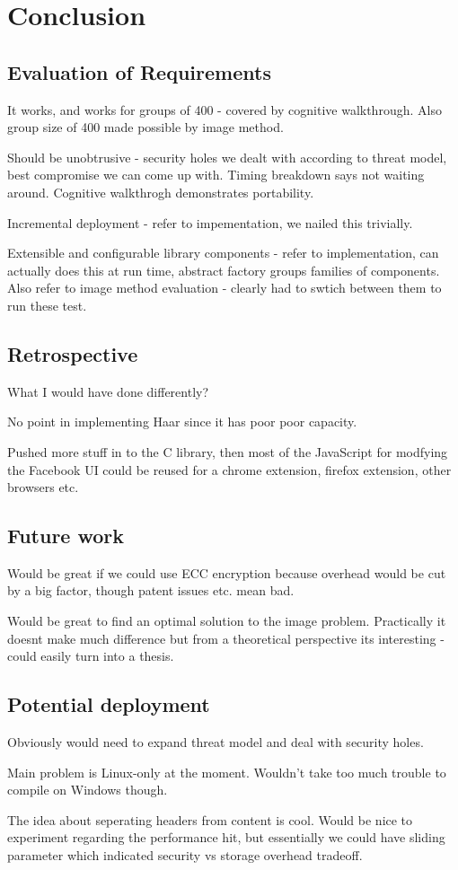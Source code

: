 \chapter{Conclusion}\label{ch:conclusion}

\section{Evaluation of Requirements}

It works, and works for groups of 400 - covered by cognitive walkthrough. Also group size of 400 made possible by image method.

Should be unobtrusive - security holes we dealt with according to threat model, best compromise we can come up with. Timing breakdown says not waiting around. Cognitive walkthrogh demonstrates portability.

Incremental deployment - refer to impementation, we nailed this trivially.

Extensible and configurable library components - refer to implementation, can actually does this at run time, abstract factory groups families of components. Also refer to image method evaluation - clearly had to swtich between them to run these test.

\section{Retrospective}

What I would have done differently?

No point in implementing Haar since it has poor poor capacity.

Pushed more stuff in to the C library, then most of the JavaScript for modfying the Facebook UI could be reused for a chrome extension, firefox extension, other browsers etc.

\section{Future work}

Would be great if we could use ECC encryption because overhead would be cut by a big factor, though patent issues etc. mean bad.

Would be great to find an optimal solution to the image problem. Practically it doesnt make much difference but from a theoretical perspective its interesting - could easily turn into a thesis.

\section{Potential deployment}

Obviously would need to expand threat model and deal with security holes.

Main problem is Linux-only at the moment. Wouldn't take too much trouble to compile on Windows though.

The idea about seperating headers from content is cool. Would be nice to experiment regarding the performance hit, but essentially we could have sliding parameter which indicated security vs storage overhead tradeoff.


